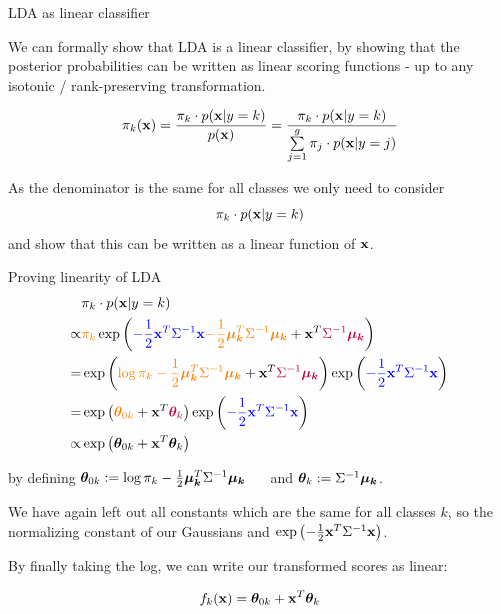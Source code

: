 \documentclass[11pt,compress,t,notes=noshow, xcolor=table]{beamer}
\begin{document}
\begin{vbframe}{LDA as linear classifier}

We can formally show that LDA is a linear classifier, by showing that the posterior probabilities
can be written as linear scoring functions - up to any isotonic / rank-preserving transformation.

$$
  \pikx = \frac{\pik \cdot \pdfxyk }{\pdfx} = \frac{\pik \cdot \pdfxyk}{\sumjg \pi_j \cdot \pdfxyk[j]}
$$

As the denominator is the same for all classes we only need to consider 
$$\pik \cdot \pdfxyk$$ 
and show that this can be written as a linear function of $\xv$.

\end{vbframe}

\begin{vbframe}{Proving linearity of LDA}
\begin{eqnarray*}
& \pik \cdot \pdfxyk \\
\propto& \textcolor{orange}{\pik} \exp\left(\textcolor{blue}{- \frac{1}{2} \xv^T\Sigma^{-1}\xv} \textcolor{orange}{- \frac{1}{2} \muk^T \Sigma^{-1} \muk} + \xv^T \textcolor{purple}{\Sigma^{-1} \muk} \right) \\
=& \exp\left(\textcolor{orange}{\log \pik - \frac{1}{2} \muk^T \Sigma^{-1} \muk} + \xv^T \textcolor{purple}{\Sigma^{-1} \muk} \right) \exp\left(\textcolor{blue}{- \frac{1}{2} \xv^T\Sigma^{-1}\xv}\right) \\
=& \exp\left(\textcolor{orange}{\thetav_{0k}} + \xv^T \textcolor{purple}{\thetav_k}\right) \exp\left(\textcolor{blue}{- \frac{1}{2} \xv^T\Sigma^{-1}\xv}\right)\\
\propto& \exp\left(\thetav_{0k} + \xv^T \thetav_k\right) 
\end{eqnarray*}

by defining
$\thetav_{0k} := \log \pik  - \frac{1}{2} \muk^T \Sigma^{-1} \muk$ $\quad$ and $\thetav_k := \Sigma^{-1} \muk$.

\lz

We have again left out all constants which are the same for all classes $k$, so the normalizing constant of our Gaussians and $\exp\left(- \frac{1}{2} \xv^T\Sigma^{-1}\xv\right)$.

\lz

By finally taking the log, we can write our transformed scores as linear:  

$$ \fkx =  \thetav_{0k} + \xv^T \thetav_k $$

\end{vbframe}
\end{document}
